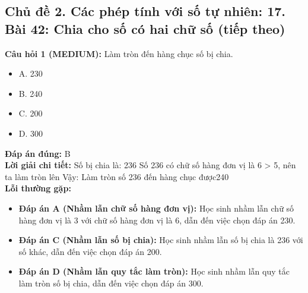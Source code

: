 \documentclass{article}
\begin{document}
\subsection{Chủ đề 2. Các phép tính với số tự nhiên: 17. Bài 42: Chia cho số có hai chữ số (tiếp theo)}
\begin{minipage}{\textwidth}
\noindent\textbf{Câu hỏi 1 (MEDIUM):} Làm tròn đến hàng chục số bị chia. 
\begin{itemize}[label={}]
    \item A. 230
    \item B. 240
    \item C. 200
    \item D. 300
\end{itemize}
\textbf{Đáp án đúng:} B \\
\textbf{Lời giải chi tiết:} Số bị chia là: 236 Số 236 có chữ số hàng đơn vị là 6 > 5, nên ta làm tròn lên Vậy: Làm tròn số 236 đến hàng chục được240 \\
\textbf{Lỗi thường gặp:}
\begin{itemize}
  \item \textbf{Đáp án A (Nhầm lẫn chữ số hàng đơn vị):} Học sinh nhầm lẫn chữ số hàng đơn vị là 3 với chữ số hàng đơn vị là 6, dẫn đến việc chọn đáp án 230.
  \item \textbf{Đáp án C (Nhầm lẫn số bị chia):} Học sinh nhầm lẫn số bị chia là 236 với số khác, dẫn đến việc chọn đáp án 200.
  \item \textbf{Đáp án D (Nhầm lẫn quy tắc làm tròn):} Học sinh nhầm lẫn quy tắc làm tròn số bị chia, dẫn đến việc chọn đáp án 300.
\end{itemize}
\end{minipage}
\vspace{1em}
\end{document}
